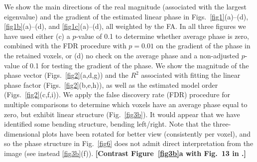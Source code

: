 \documentclass[authoryear,preprint,12pt]{elsarticle}
\begin{document}

We show the main directions of the real magnitude (associated with the
largest eigenvalue) and the gradient of the estimated linear phase in
Figs.~\ref{fig1}(a)--(d), \ref{fig1b}(a)--(d), and
\ref{fig1c}(a)--(d), all weighted by the FA.  In all three figures we
have used either (c) a $p$-value of 0.1 to determine whether average
phase is zero, combined with the FDR procedure with $p=0.01$ on the
gradient of the phase in the retained voxels, or (d) no check on the
average phase and a non-adjusted $p$-value of 0.1 for testing the
gradient of the phase.
We show the magnitude of the phase vector (Figs.~\ref{fig2}(a,d,g))
and the $R^2$ associated with fitting the linear phase factor
(Figs.~\ref{fig2}(b,e,h)), as well as the estimated model order
(Figs.~\ref{fig2}(c,f,i)).  We apply the false discovery rate (FDR)
procedure for multiple comparisons
\citep{Benjamini,gen-laz-nic:thresholding} to determine which voxels
have an average phase equal to zero, but exhibit linear structure
(Fig.~\ref{fig3b}).
It would appear that we have identified some bending structure,
bending left/right.  Note that the three-dimensional plots have been
rotated for better view (consistently per voxel), and so the phase
structure in Fig.~\ref{fig6} does not admit direct interpretation from
the image (see instead \ref{fig3b}(f)).  \textbf{[Contrast
    Figure~\ref{fig3b}a with Fig.~13 in \citet{jon:studying}.]}
\end{document}
